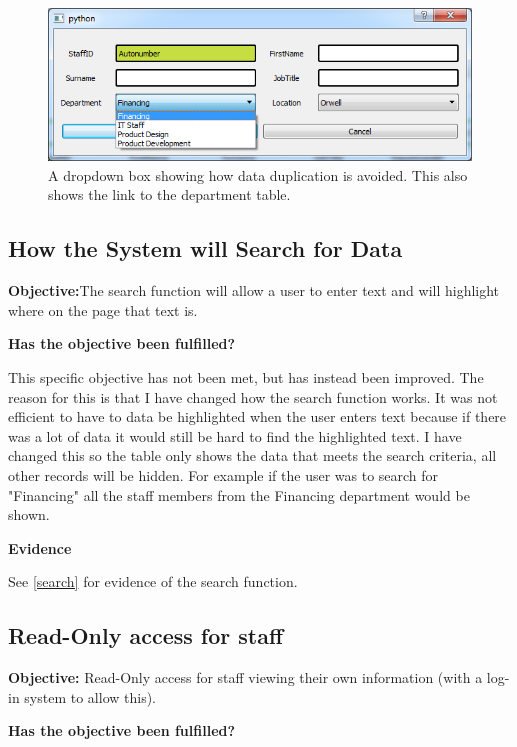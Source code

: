 \begin{figure}[H]
    \includegraphics[width=\textwidth]{./Evaluation/Images/dropdown.png}
    \caption{A dropdown box showing how data duplication is avoided. This also shows the link to the department table.} 
\end{figure}



\subsection{How the System will Search for Data}

\textbf{Objective:}The search function will allow a user to enter text and will highlight where on the page that text is.

\textbf{Has the objective been fulfilled?}

This specific objective has not been met, but has instead been improved. The reason for this is that I have changed how the search function works. It was not efficient to have to data be highlighted when the user enters text because if there was a lot of data it would still be hard to find the highlighted text. I have changed this so the table only shows the data that meets the search criteria, all other records will be hidden. For example if the user was to search for "Financing" all the staff members from the Financing department would be shown.

\textbf{Evidence}

See \ref{search} for evidence of the search function.


\subsection{Read-Only access for staff}

\textbf{Objective:} Read-Only access for staff viewing their own information (with a log-in system to allow this).

\textbf{Has the objective been fulfilled?}


